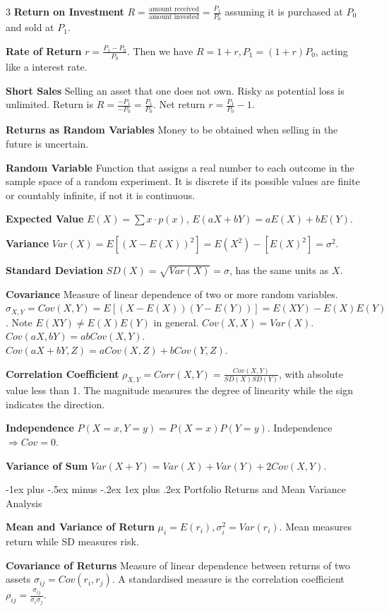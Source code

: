 \documentclass[10pt, landscape]{article}
\makeatletter
\renewcommand{\subsection}{\@startsection{subsection}{3}{0mm}%
                                {-1ex plus -.5ex minus -.2ex}%
                                {1ex plus .2ex}%
                                {\normalfont\small\bfseries}}%
\makeatother
\begin{document}
\begin{multicols*}{3}
\textbf{Return on Investment} $R = \frac{\text{amount received}}{\text{amount invested}}=\frac{P_1}{P_0}$ assuming it is purchased at $P_0$ and sold at $P_1$.

\textbf{Rate of Return} $r=\frac{P_1-P_0}{P_0}$. Then we have $R=1+r, P_1=(1+r)P_0$, acting like a interest rate.

\textbf{Short Sales} Selling an asset that one does not own. Risky as potential loss is unlimited. Return is $R=\frac{-P_1}{-P_0}=\frac{P_1}{P_0}$. Net return $r=\frac{P_1}{P_0}-1$.

\textbf{Returns as Random Variables} Money to be obtained when selling in the future is uncertain.

\textbf{Random Variable} Function that assigns a real number to each outcome in the sample space of a random experiment. It is discrete if its possible values are finite or countably infinite, if not it is continuous.

\textbf{Expected Value} $E(X)=\sum x \cdot p(x)$, $E(aX+bY)=aE(X)+bE(Y)$.

\textbf{Variance} $Var(X)=E[(X-E(X))^2]=E(X^2)-[E(X)^2]=\sigma^2$.

\textbf{Standard Deviation} $SD(X)=\sqrt{Var(X)}=\sigma$, has the same units as $X$.

\textbf{Covariance} Measure of linear dependence of two or more random variables. $\sigma_{X,Y}=Cov(X, Y)=E[(X-E(X))(Y-E(Y))]=E(XY)-E(X)E(Y)$. Note $E(XY) \neq E(X)E(Y)$ in general. $Cov(X,X)=Var(X)$. $Cov(aX, bY)=abCov(X, Y)$. $Cov(aX+bY, Z)=aCov(X, Z)+bCov(Y, Z)$.

\textbf{Correlation Coefficient} $\rho_{X, Y}=Corr(X, Y)=\frac{Cov(X, Y)}{SD(X)SD(Y)}$, with absolute value less than 1. The magnitude measures the degree of linearity while the sign indicates the direction.

\textbf{Independence} $P(X=x, Y=y)=P(X=x)P(Y=y)$. Independence $\Rightarrow Cov=0$.

\textbf{Variance of Sum} $Var(X+Y)=Var(X)+Var(Y)+2Cov(X, Y)$.

\subsection{Portfolio Returns and Mean Variance Analysis}

\textbf{Mean and Variance of Return} $\mu_i=E(r_i), \sigma_i^2=Var(r_i)$. Mean measures return while SD measures risk.

\textbf{Covariance of Returns} Measure of linear dependence between returns of two assets $\sigma_{ij}=Cov(r_i, r_j)$. A standardised measure is the correlation coefficient $\rho_{ij}=\frac{\sigma_{ij}}{\sigma_i \sigma_j}$.


\end{multicols*}
\end{document}
